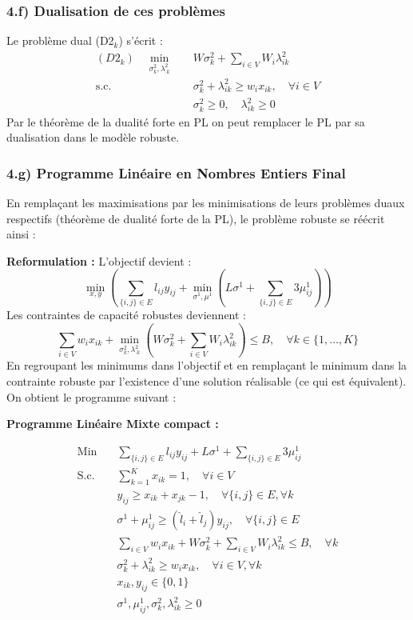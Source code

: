 \documentclass{article}
\begin{document}
\subsubsection*{4.f) Dualisation de ces problèmes}
 Le problème dual (D2$_k$) s'écrit :
\begin{align*}
    (D2_k) \quad \min_{\sigma_k^2, \lambda_{\cdot k}^2} \quad & W \sigma_k^2 + \sum_{i \in V} W_i \lambda_{ik}^2 \\
    \text{s.c.} \quad & \sigma_k^2 + \lambda_{ik}^2 \ge w_i x_{ik}, \quad \forall i \in V \\
    & \sigma_k^2 \ge 0, \quad \lambda_{ik}^2 \ge 0
\end{align*}
Par le théorème de la dualité forte en PL on peut remplacer le PL par sa dualisation dans le modèle robuste.

\subsubsection*{4.g) Programme Linéaire en Nombres Entiers Final}

En remplaçant les maximisations par les minimisations de leurs problèmes duaux respectifs (théorème de dualité forte de la PL), le problème robuste se réécrit ainsi :

\textbf{Reformulation :}
L'objectif devient :
\[
\min_{x,y} \left( \sum_{\{i,j\} \in E} l_{ij} y_{ij} + \min_{\sigma^1, \mu^1} \left( L \sigma^1 + \sum_{\{i,j\} \in E} 3 \mu_{ij}^1 \right) \right)
\]
Les contraintes de capacité robustes deviennent :
\[
\sum_{i \in V} w_i x_{ik} + \min_{\sigma_k^2, \lambda_{\cdot k}^2} \left( W \sigma_k^2 + \sum_{i \in V} W_i \lambda_{ik}^2 \right) \le B, \quad \forall k \in \{1, \dots, K\}
\]
En regroupant les minimums dans l'objectif et en remplaçant le minimum dans la contrainte robuste par l'existence d'une solution réalisable (ce qui est équivalent). On obtient le programme suivant :

\textbf{Programme Linéaire Mixte compact :}

\begin{align}
    \text{Min} \quad & \sum_{\{i,j\} \in E} l_{ij} y_{ij} + L \sigma^1 + \sum_{\{i,j\} \in E} 3 \mu_{ij}^1 \\
    \text{S.c.} \quad & \sum_{k=1}^{K} x_{ik} = 1, \quad \forall i \in V \\
    & y_{ij} \ge x_{ik} + x_{jk} - 1, \quad \forall \{i,j\} \in E, \forall k \\
    & \sigma^1 + \mu_{ij}^1 \ge (\hat{l}_i + \hat{l}_j) y_{ij}, \quad \forall \{i,j\} \in E \\
    & \sum_{i \in V} w_i x_{ik} + W \sigma_k^2 + \sum_{i \in V} W_i \lambda_{ik}^2 \le B, \quad \forall k \\
    & \sigma_k^2 + \lambda_{ik}^2 \ge w_i x_{ik}, \quad \forall i \in V, \forall k \\
    & x_{ik}, y_{ij} \in \{0,1\} \\
    & \sigma^1, \mu_{ij}^1, \sigma_k^2, \lambda_{ik}^2 \ge 0
\end{align}
\end{document}
